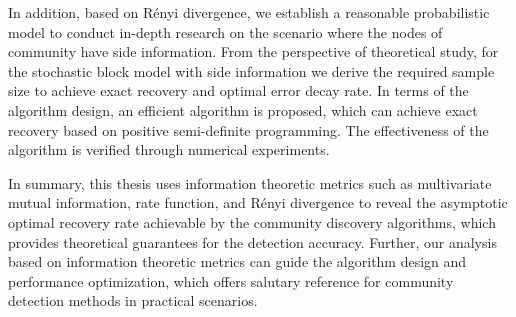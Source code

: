 \begin{abstract*}
  In addition, based on Rényi divergence,
  we establish a reasonable probabilistic model
  to conduct in-depth research on the scenario
  where the nodes of community have side information.
  From the perspective of theoretical study,
  for the stochastic block model with side information
  we derive the required sample size to achieve exact recovery and optimal error decay rate.
  In terms of the algorithm design,
  an efficient algorithm is proposed, which can achieve exact recovery based on positive semi-definite programming.
  The effectiveness of the algorithm is verified through numerical experiments.

  In summary, this thesis uses information theoretic metrics
  such as multivariate mutual information,
  rate function, and Rényi divergence to reveal the asymptotic
  optimal recovery rate achievable by the community discovery algorithms,
  which provides theoretical guarantees for the detection accuracy.
  Further, our analysis based on information theoretic metrics can guide the algorithm design and performance optimization,
  which offers salutary reference
  for community detection methods in practical scenarios.
\end{abstract*}
